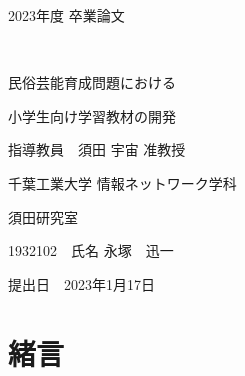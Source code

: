 \documentclass[12pt]{ltjsarticle}
\begin{document}
\begin{titlepage}
  \begin{center}
  
    \vspace*{20truept}
    
    {\LARGE 2023年度 卒業論文} 
    
    \vspace*{75truept}
    
    {\Huge }　%

    \vspace{10truept}

    {\Huge 民俗芸能育成問題における}　%

    \vspace{10truept}

    {\Huge 小学生向け学習教材の開発}　%

    \vspace{85truept}
    
    {\LARGE 指導教員　須田 宇宙 准教授}
    
    \vspace{60truept}
    
    {\LARGE 千葉工業大学 情報ネットワーク学科}
    
    \vspace{15truept}
    
    {\LARGE 須田研究室}
    
    \vspace{70truept}
    
    {\LARGE 1932102　氏名 永塚　迅一 }　%

    \vspace{70truept}
    
  \end{center}
  \begin{flushright}

    {\LARGE 提出日　2023年1月17日}
  
  \end{flushright}
\end{titlepage}

\newpage
\setcounter{tocdepth}{3}
\pagestyle{plain}



\tableofcontents
\listoftables
\listoffigures
\newpage
{}
\section{緒言}
\end{document}
